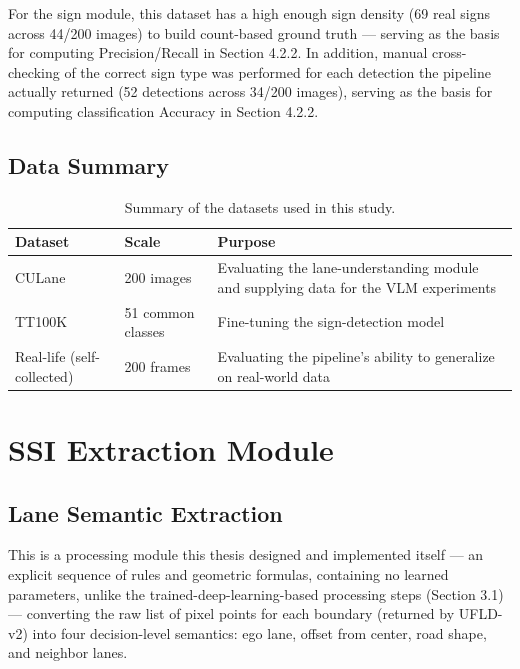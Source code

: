 \documentclass[12pt,a4paper]{report}
\begin{document}
For the sign module, this dataset has a high enough sign density (69 real signs across 44/200 images) to build count-based ground truth --- serving as the basis for computing Precision/Recall in Section 4.2.2. In addition, manual cross-checking of the correct sign type was performed for each detection the pipeline actually returned (52 detections across 34/200 images), serving as the basis for computing classification Accuracy in Section 4.2.2.

\subsection{Data Summary}

\begin{table}[htbp]
    \centering
    \small
    \caption{Summary of the datasets used in this study.}
    \label{tab:3.2}
    \begin{tabularx}{\linewidth}{@{}lp{3cm}X@{}}
        \toprule
        \textbf{Dataset} & \textbf{Scale} & \textbf{Purpose} \\
        \midrule
        CULane \cite{pan2018culane} & 200 images & Evaluating the lane-understanding module and supplying data for the VLM experiments \\
        TT100K \cite{zhu2016tt100k} & 51 common classes & Fine-tuning the sign-detection model \\
        Real-life (self-collected) & 200 frames & Evaluating the pipeline's ability to generalize on real-world data \\
        \bottomrule
    \end{tabularx}
\end{table}

\section{SSI Extraction Module}

\subsection{Lane Semantic Extraction}

This is a processing module this thesis designed and implemented itself --- an explicit sequence of rules and geometric formulas, containing no learned parameters, unlike the trained-deep-learning-based processing steps (Section 3.1) --- converting the raw list of pixel points for each boundary (returned by UFLD-v2) into four decision-level semantics: ego lane, offset from center, road shape, and neighbor lanes.
\end{document}
